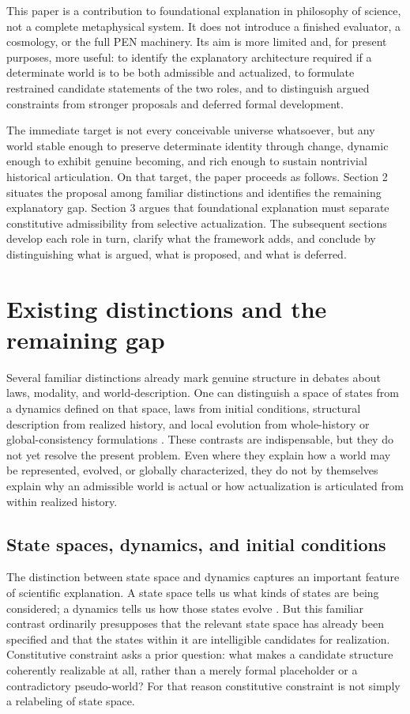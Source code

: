 \documentclass[11pt]{article}
\theoremstyle{foundation}
\begin{document}
This paper is a contribution to foundational explanation in philosophy of science, not a complete metaphysical system. It does not introduce a finished evaluator, a cosmology, or the full PEN machinery. Its aim is more limited and, for present purposes, more useful: to identify the explanatory architecture required if a determinate world is to be both admissible and actualized, to formulate restrained candidate statements of the two roles, and to distinguish argued constraints from stronger proposals and deferred formal development.

The immediate target is not every conceivable universe whatsoever, but any world stable enough to preserve determinate identity through change, dynamic enough to exhibit genuine becoming, and rich enough to sustain nontrivial historical articulation. On that target, the paper proceeds as follows. Section 2 situates the proposal among familiar distinctions and identifies the remaining explanatory gap. Section 3 argues that foundational explanation must separate constitutive admissibility from selective actualization. The subsequent sections develop each role in turn, clarify what the framework adds, and conclude by distinguishing what is argued, what is proposed, and what is deferred.

\section{Existing distinctions and the remaining gap}

Several familiar distinctions already mark genuine structure in debates about laws, modality, and world-description. One can distinguish a space of states from a dynamics defined on that space, laws from initial conditions, structural description from realized history, and local evolution from whole-history or global-consistency formulations \citep{Cartwright1983,vanFraassen1989,Maudlin2007,Price1996}. These contrasts are indispensable, but they do not yet resolve the present problem. Even where they explain how a world may be represented, evolved, or globally characterized, they do not by themselves explain why an admissible world is actual or how actualization is articulated from within realized history.

\subsection{State spaces, dynamics, and initial conditions}

The distinction between state space and dynamics captures an important feature of scientific explanation. A state space tells us what kinds of states are being considered; a dynamics tells us how those states evolve \citep{Cartwright1983,Maudlin2007}. But this familiar contrast ordinarily presupposes that the relevant state space has already been specified and that the states within it are intelligible candidates for realization. Constitutive constraint asks a prior question: what makes a candidate structure coherently realizable at all, rather than a merely formal placeholder or a contradictory pseudo-world? For that reason constitutive constraint is not simply a relabeling of state space.
\end{document}
